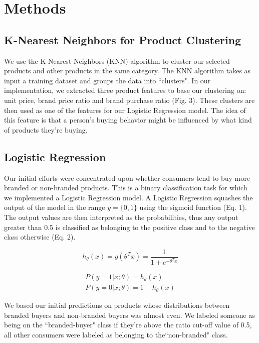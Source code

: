 \documentclass[conference]{IEEEtran}
\begin{document}
\section{Methods}

\subsection{K-Nearest Neighbors for Product Clustering}
We use the K-Nearest Neighbors (KNN) algorithm to cluster our selected products and other products in the same category. The KNN algorithm takes as input a training dataset and groups the data into ``clusters". In our implementation, we extracted three product features to base our clustering on: unit price, brand price ratio and brand purchase ratio (Fig. 3). These clusters are then used as one of the features for our Logistic Regression model. The idea of this feature is that a person's buying behavior might be influenced by what kind of products they're buying.

\subsection{Logistic Regression}
Our initial efforts were concentrated upon whether consumers tend to buy more branded or non-branded products. This is a binary classification task for which we implemented a Logistic Regression model. A Logistic Regression squashes the output of the model in the range $y = \{0,1\} $  using the sigmoid function (Eq. 1). The output values are then interpreted as the probabilities, thus any output greater than 0.5 is classified as belonging to the positive class and to the negative class otherwise (Eq. 2).

\begin{equation}
h_\theta(x) = g(\theta^Tx) =  \frac{1}{1 + e^{-\theta^Tx}}
\end{equation}

\begin{equation}
\begin{aligned}
P(y = 1 | x;\theta) = h_\theta(x) \\
P(y = 0 | x;\theta) = 1 - h_\theta(x)
\end{aligned}
\end{equation}

We based our initial predictions on products whose distributions between branded buyers and non-branded buyers was almost even. We labeled someone as being on the ``branded-buyer" class if they're above the ratio cut-off value of 0.5, all other consumers were labeled as belonging to the``non-branded" class. 
\end{document}

